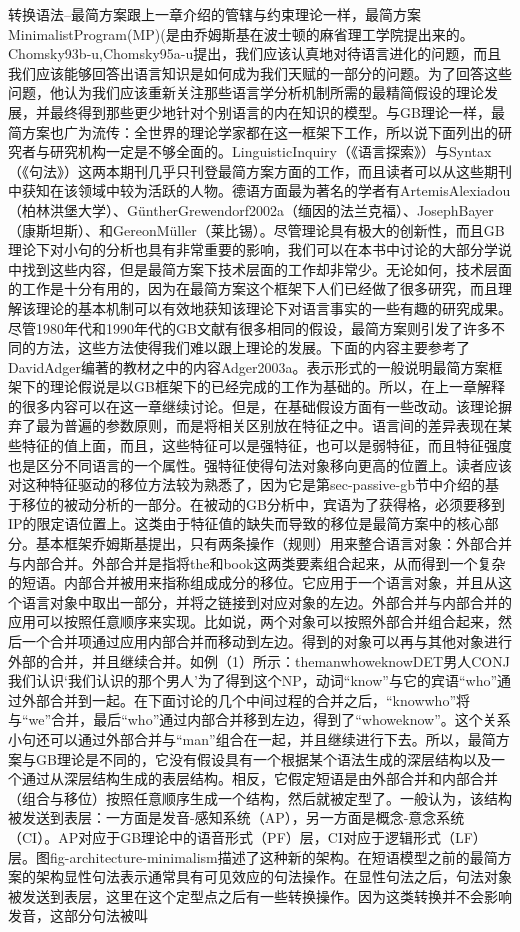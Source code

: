 转换语法--最简方案跟上一章介绍的管辖与约束理论一样，最简方案MinimalistProgram(MP)(是由乔姆斯基在波士顿的麻省理工学院提出来的。Chomsky93b-u,Chomsky95a-u提出，我们应该认真地对待语言进化的问题，而且我们应该能够回答出语言知识是如何成为我们天赋的一部分的问题。为了回答这些问题，他认为我们应该重新关注那些语言学分析机制所需的最精简假设的理论发展，并最终得到那些更少地针对个别语言的内在知识的模型。与GB理论一样，最简方案也广为流传：全世界的理论学家都在这一框架下工作，所以说下面列出的研究者与研究机构一定是不够全面的。LinguisticInquiry（《语言探索》）与Syntax（《句法》）这两本期刊几乎只刊登最简方案方面的工作，而且读者可以从这些期刊中获知在该领域中较为活跃的人物。德语方面最为著名的学者有ArtemisAlexiadou（柏林洪堡大学）、GüntherGrewendorf2002a（缅因的法兰克福）、JosephBayer（康斯坦斯）、和GereonMüller（莱比锡）。尽管理论具有极大的创新性，而且GB理论下对小句的分析也具有非常重要的影响，我们可以在本书中讨论的大部分学说中找到这些内容，但是最简方案下技术层面的工作却非常少。无论如何，技术层面的工作是十分有用的，因为在最简方案这个框架下人们已经做了很多研究，而且理解该理论的基本机制可以有效地获知该理论下对语言事实的一些有趣的研究成果。尽管1980年代和1990年代的GB文献有很多相同的假设，最简方案则引发了许多不同的方法，这些方法使得我们难以跟上理论的发展。下面的内容主要参考了DavidAdger编著的教材之中的内容Adger2003a。表示形式的一般说明最简方案框架下的理论假说是以GB框架下的已经完成的工作为基础的。所以，在上一章解释的很多内容可以在这一章继续讨论。但是，在基础假设方面有一些改动。该理论摒弃了最为普遍的参数原则，而是将相关区别放在特征之中。语言间的差异表现在某些特征的值上面，而且，这些特征可以是强特征，也可以是弱特征，而且特征强度也是区分不同语言的一个属性。强特征使得句法对象移向更高的位置上。读者应该对这种特征驱动的移位方法较为熟悉了，因为它是第sec-passive-gb节中介绍的基于移位的被动分析的一部分。在被动的GB分析中，宾语为了获得格，必须要移到IP的限定语位置上。这类由于特征值的缺失而导致的移位是最简方案中的核心部分。基本框架乔姆斯基提出，只有两条操作（规则）用来整合语言对象：外部合并与内部合并。外部合并是指将the和book这两类要素组合起来，从而得到一个复杂的短语。内部合并被用来指称组成成分的移位。它应用于一个语言对象，并且从这个语言对象中取出一部分，并将之链接到对应对象的左边。外部合并与内部合并的应用可以按照任意顺序来实现。比如说，两个对象可以按照外部合并组合起来，然后一个合并项通过应用内部合并而移动到左边。得到的对象可以再与其他对象进行外部的合并，并且继续合并。如例（1）所示：themanwhoweknowDET男人CONJ我们认识`我们认识的那个男人'为了得到这个NP，动词“know”与它的宾语“who”通过外部合并到一起。在下面讨论的几个中间过程的合并之后，“knowwho”将与“we”合并，最后“who”通过内部合并移到左边，得到了“whoweknow”。这个关系小句还可以通过外部合并与“man”组合在一起，并且继续进行下去。所以，最简方案与GB理论是不同的，它没有假设具有一个根据某个语法生成的深层结构以及一个通过从深层结构生成的表层结构。相反，它假定短语是由外部合并和内部合并（组合与移位）按照任意顺序生成一个结构，然后就被定型了。一般认为，该结构被发送到表层：一方面是发音-感知系统（AP），另一方面是概念-意念系统（CI）。AP对应于GB理论中的语音形式（PF）层，CI对应于逻辑形式（LF）层。图fig-architecture-minimalism描述了这种新的架构。在短语模型之前的最简方案的架构显性句法表示通常具有可见效应的句法操作。在显性句法之后，句法对象被发送到表层，这里在这个定型点之后有一些转换操作。因为这类转换并不会影响发音，这部分句法被叫